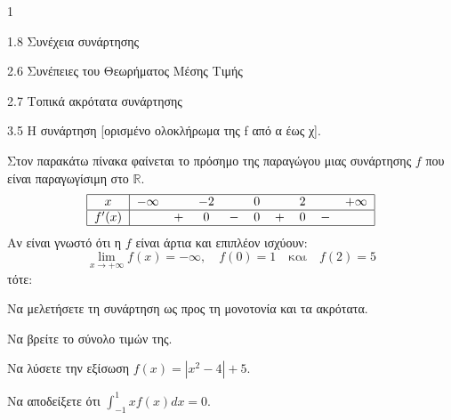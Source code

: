 \begin{ylh}{1}
    \item 1.8 Συνέχεια συνάρτησης
    \item 2.6 Συνέπειες του Θεωρήματος Μέσης Τιμής
    \item 2.7 Τοπικά ακρότατα συνάρτησης
    \item 3.5 Η συνάρτηση [ορισμένο ολοκλήρωμα της f από α έως χ].
\end{ylh}
Στον παρακάτω πίνακα φαίνεται το πρόσημο της παραγώγου μιας συνάρτησης $f$ που είναι παραγωγίσιμη στο $\mathbb{R}$.
\[
\begin{tabular}{|c|ccccccccc|}
\hline
$x$ & $-\infty$ & & $-2$ & & $0$ & & $2$ & & $+\infty$ \\
\hline
$f'(x)$ & & $+$ & $0$ & $-$ & $0$ & $+$ & $0$ & $-$ & \\
\hline
\end{tabular}
\]
Αν είναι γνωστό ότι η $f$ είναι άρτια και επιπλέον ισχύουν:
\[ \lim_{x \to +\infty} f(x) = -\infty, \quad f(0)=1 \quad \text{και} \quad f(2)=5 \]
τότε:
\begin{alist}
\item Να μελετήσετε τη συνάρτηση ως προς τη μονοτονία και τα ακρότατα. 
\item Να βρείτε το σύνολο τιμών της. 
\item Να λύσετε την εξίσωση $f(x)=|x^2-4|+5$. 
\item Να αποδείξετε ότι $\int_{-1}^{1} xf(x)dx = 0$. 
\end{alist}